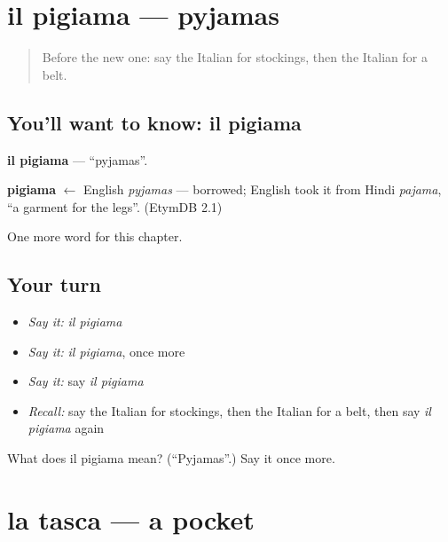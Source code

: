 \section[il pigiama]{il pigiama — pyjamas}

\label{lesson:IT-C220-pigiama}



\begin{quote}
Before the new one: say the Italian for stockings, then the Italian for a belt.
\end{quote}

\subsection*{You'll want to know: il pigiama}
\textbf{il pigiama} — \textquotedblleft{}pyjamas\textquotedblright{}.

\begin{cousinweb}
\textbf{pigiama} $\leftarrow$ English \emph{pyjamas} — borrowed; English took it from Hindi \emph{pajama}, \textquotedblleft{}a garment for the legs\textquotedblright{}. (EtymDB 2.1)
\end{cousinweb}

\begin{grammarlens}[title={What you've built}]
One more word for this chapter.
\end{grammarlens}

\subsection*{Your turn}
\begin{itemize}
\raggedright
  \item \emph{Say it:} \emph{il pigiama}
  \item \emph{Say it:} \emph{il pigiama}, once more
  \item \emph{Say it:} say \emph{il pigiama}
  \item \emph{Recall:} say the Italian for stockings, then the Italian for a belt, then say \emph{il pigiama} again
\end{itemize}

\begin{tcolorbox}[breakable,colback=teal!4,colframe=teal!35!black,title={Before you move on}]
What does il pigiama mean? (\textquotedblleft{}Pyjamas\textquotedblright{}.) Say it once more.
\end{tcolorbox}
\section[la tasca]{la tasca — a pocket}

